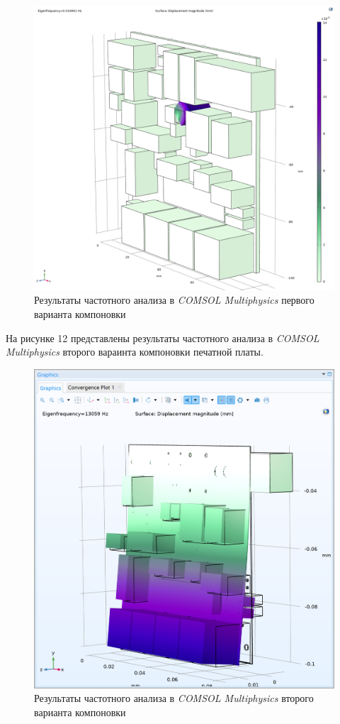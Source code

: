 \begin{figure}[h]
  \centering
  \includegraphics[scale=0.3]{../img/sst-1/freq/comsol.png}
  \caption{Результаты частотного анализа в \textit{COMSOL Multiphysics} первого варианта компоновки}
\end{figure}

На рисунке 12 представлены результаты частотного анализа в \textit{COMSOL Multiphysics} второго вараинта компоновки печатной платы.

\begin{figure}[h]
  \centering
  \includegraphics[scale=0.3]{../img/scrot/Screenshot-2024-05-16-014808.png}
  \caption{Результаты частотного анализа в \textit{COMSOL Multiphysics}
    второго варианта компоновки}
\end{figure}

